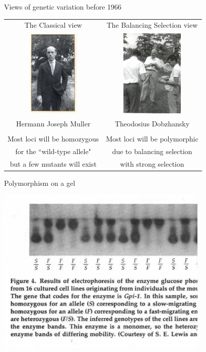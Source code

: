 \documentclass[bluish,slideColor,colorBG]{prosper}
\begin{document}
{\begin{slide}[Replace]{Views of genetic variation before 1966}
\begin{tabular}{c c}
The Classical view  & The Balancing Selection view \\
\includegraphics[width=1in]{muller.ps} & \includegraphics[width=1.2in]{dobybrazil.ps} \\
Hermann Joseph Muller & Theodosius Dobzhansky \\
 & \\
Most loci will be homozygous   &    Most loci will be polymorphic \\
for the ``wild-type allele"    &    due to balancing selection \\
but a few mutants will exist   &    with strong selection \\
\end{tabular}

\noindent

\end{slide}

\begin{slide}[Replace]{Polymorphism on a gel}

\centerline{\includegraphics[width=4in]{gelpoly.ps}}


\end{slide}}
\end{document}
